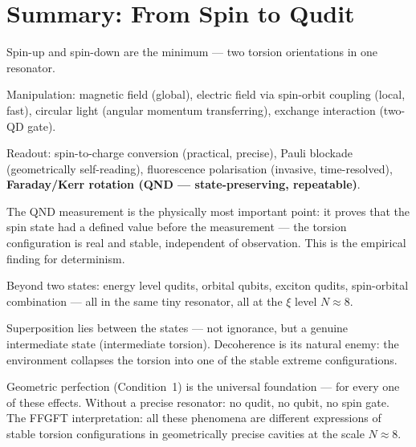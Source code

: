 \section{Summary: From Spin to Qudit}
\label{sec:summary-174}

\begin{conclusionBox}[Conclusion]
Spin-up and spin-down are the minimum ---
two torsion orientations in one resonator.

Manipulation: magnetic field (global), electric field
via spin-orbit coupling (local, fast), circular light
(angular momentum transferring), exchange interaction (two-QD gate).

Readout: spin-to-charge conversion (practical, precise),
Pauli blockade (geometrically self-reading),
fluorescence polarisation (invasive, time-resolved),
\textbf{Faraday/Kerr rotation (QND --- state-preserving, repeatable)}.

The QND measurement is the physically most important point:
it proves that the spin state had a defined value
before the measurement --- the torsion configuration
is real and stable, independent of observation.
This is the empirical finding for determinism.

Beyond two states:
energy level qudits, orbital qubits, exciton qudits,
spin-orbital combination --- all in the same
tiny resonator, all at the $\xi$ level $N \approx 8$.

Superposition lies between the states ---
not ignorance, but a genuine intermediate state
(intermediate torsion).
Decoherence is its natural enemy:
the environment collapses the torsion into one of the
stable extreme configurations.

Geometric perfection (Condition~1) is
the universal foundation --- for every one of these effects.
Without a precise resonator: no qudit, no qubit,
no spin gate. The FFGFT interpretation:
all these phenomena are different expressions
of stable torsion configurations in geometrically
precise cavities at the scale $N \approx 8$.
\end{conclusionBox}


